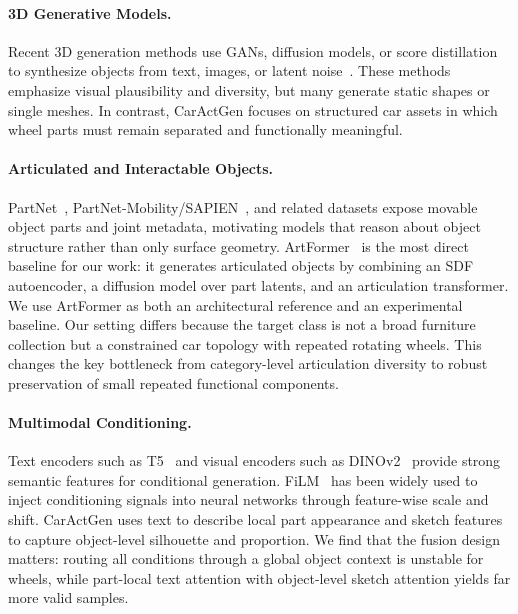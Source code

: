 \documentclass[10pt]{article}
\newcommand{\method}{CarActGen\xspace}
\newcommand{\artformer}{ArtFormer\xspace}
\begin{document}
\paragraph{3D Generative Models.}
Recent 3D generation methods use GANs, diffusion models, or score distillation to synthesize objects from text, images, or latent noise~\cite{poole2022dreamfusion,lin2023magic3d,jun2023shap-e,nichol2022point-e}. These methods emphasize visual plausibility and diversity, but many generate static shapes or single meshes. In contrast, \method focuses on structured car assets in which wheel parts must remain separated and functionally meaningful.

\paragraph{Articulated and Interactable Objects.}
PartNet~\cite{mo2019partnet}, PartNet-Mobility/SAPIEN~\cite{xiang2020sapien}, and related datasets expose movable object parts and joint metadata, motivating models that reason about object structure rather than only surface geometry. \artformer~\cite{artformer2025} is the most direct baseline for our work: it generates articulated objects by combining an SDF autoencoder, a diffusion model over part latents, and an articulation transformer. We use \artformer as both an architectural reference and an experimental baseline. Our setting differs because the target class is not a broad furniture collection but a constrained car topology with repeated rotating wheels. This changes the key bottleneck from category-level articulation diversity to robust preservation of small repeated functional components.

\paragraph{Multimodal Conditioning.}
Text encoders such as T5~\cite{raffel2020t5} and visual encoders such as DINOv2~\cite{oquab2023dinov2} provide strong semantic features for conditional generation. FiLM~\cite{perez2018film} has been widely used to inject conditioning signals into neural networks through feature-wise scale and shift. \method uses text to describe local part appearance and sketch features to capture object-level silhouette and proportion. We find that the fusion design matters: routing all conditions through a global object context is unstable for wheels, while part-local text attention with object-level sketch attention yields far more valid samples.
\end{document}
